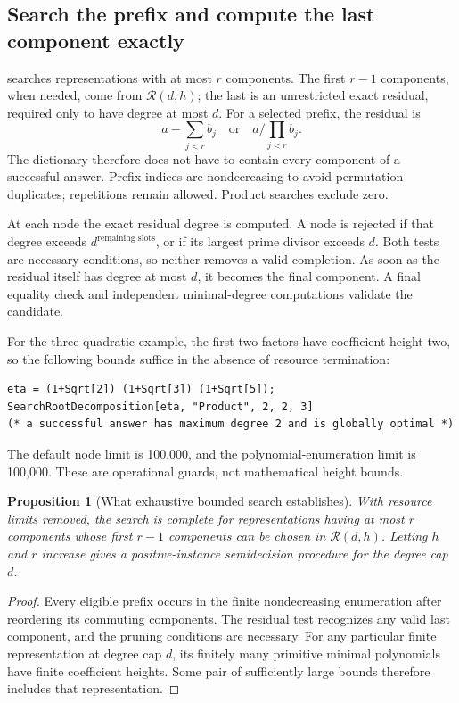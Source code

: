 \documentclass[11pt,a4paper]{article}
\newtheorem{proposition}[theorem]{Proposition}
\theoremstyle{definition}\newtheorem{definition}[theorem]{Definition}
\theoremstyle{remark}\newtheorem{remark}[theorem]{Remark}
\newcommand{\code}[1]{\texttt{\detokenize{#1}}}
\begin{document}
\subsection{Search the prefix and compute the last component exactly}

\code{SearchRootDecomposition[a,op,d,h,r]} searches representations with at
most $r$ components. The first $r-1$ components, when needed, come from
$\mathcal R(d,h)$; the last is an unrestricted exact residual, required
only to have degree at most $d$. For a selected prefix, the residual is
\[
 a-\sum_{j<r}b_j\quad\text{or}\quad
 a\bigg/\prod_{j<r}b_j.
\]
The dictionary therefore does not have to contain every component of a
successful answer. Prefix indices are nondecreasing to avoid permutation
duplicates; repetitions remain allowed. Product searches exclude zero.

At each node the exact residual degree is computed. A node is rejected if
that degree exceeds $d^{\text{remaining slots}}$, or if its largest prime
divisor exceeds $d$. Both tests are necessary conditions, so neither removes
a valid completion. As soon as the residual itself has degree at most $d$,
it becomes the final component. A final \code{RootReduce} equality check
and independent minimal-degree computations validate the candidate.

For the three-quadratic example, the first two factors have coefficient
height two, so the following bounds suffice in the absence of resource
termination:
\begin{lstlisting}
eta = (1+Sqrt[2]) (1+Sqrt[3]) (1+Sqrt[5]);
SearchRootDecomposition[eta, "Product", 2, 2, 3]
(* a successful answer has maximum degree 2 and is globally optimal *)
\end{lstlisting}
The default node limit is 100,000, and the polynomial-enumeration limit is
100,000. These are operational guards, not mathematical height bounds.

\begin{proposition}[What exhaustive bounded search establishes]
With resource limits removed, the search is complete for representations
having at most $r$ components whose first $r-1$ components can be chosen in
$\mathcal R(d,h)$. Letting $h$ and $r$ increase gives a positive-instance
semidecision procedure for the degree cap $d$.
\end{proposition}
\begin{proof}
Every eligible prefix occurs in the finite nondecreasing enumeration after
reordering its commuting components. The residual test recognizes any valid
last component, and the pruning conditions are necessary. For any particular
finite representation at degree cap $d$, its finitely many primitive minimal
polynomials have finite coefficient heights. Some pair of sufficiently
large bounds therefore includes that representation.
\end{proof}
\end{document}
